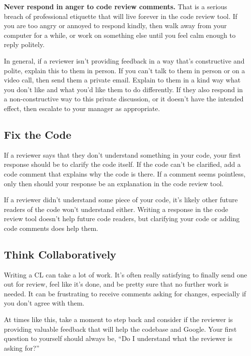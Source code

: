 \documentclass[
]{article}
\begin{document}
\textbf{Never respond in anger to code review comments.} That is a
serious breach of professional etiquette that will live forever in the
code review tool. If you are too angry or annoyed to respond kindly,
then walk away from your computer for a while, or work on something else
until you feel calm enough to reply politely.

In general, if a reviewer isn't providing feedback in a way that's
constructive and polite, explain this to them in person. If you can't
talk to them in person or on a video call, then send them a private
email. Explain to them in a kind way what you don't like and what you'd
like them to do differently. If they also respond in a non-constructive
way to this private discussion, or it doesn't have the intended effect,
then escalate to your manager as appropriate.

\subsection{Fix the Code}\label{code}

If a reviewer says that they don't understand something in your code,
your first response should be to clarify the code itself. If the code
can't be clarified, add a code comment that explains why the code is
there. If a comment seems pointless, only then should your response be
an explanation in the code review tool.

If a reviewer didn't understand some piece of your code, it's likely
other future readers of the code won't understand either. Writing a
response in the code review tool doesn't help future code readers, but
clarifying your code or adding code comments does help them.

\subsection{Think Collaboratively}\label{think}

Writing a CL can take a lot of work. It's often really satisfying to
finally send one out for review, feel like it's done, and be pretty sure
that no further work is needed. It can be frustrating to receive
comments asking for changes, especially if you don't agree with them.

At times like this, take a moment to step back and consider if the
reviewer is providing valuable feedback that will help the codebase and
Google. Your first question to yourself should always be, ``Do I
understand what the reviewer is asking for?''
\end{document}
